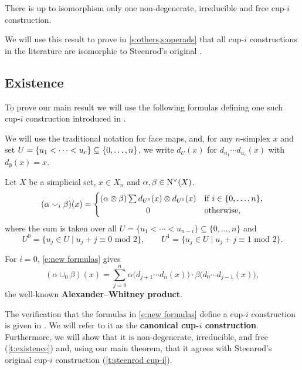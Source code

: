 \begin{theorem}\label{t:main}
	There is up to isomorphism only one non-degenerate, irreducible and free \mbox{cup-$i$} construction.
\end{theorem}

We will use this result to prove in \cref{s:others,s:operads} that all \mbox{cup-$i$} constructions in the literature are isomorphic to Steenrod's original \cite{steenrod1947products}.

\subsection{Existence}

To prove our main result we will use the following formulas defining one such \mbox{cup-$i$} construction introduced in \cite{medina2023fast_sq}.

\begin{notation*}
	We will use the traditional notation for face maps, and, for any $n$-simplex $x$ and set $U = \{u_1 < \dots < u_r\} \subseteq \set[big]{0,\dots,n}$, we write $d_U(x)$ for $d_{u_1}\! \dotsm d_{u_r}(x)$ with $d_{\emptyset}(x) = x$.
\end{notation*}

\begin{definition} \label{d:my cup-i}
	Let $X$ be a simplicial set, $x \in X_n$ and $\alpha, \beta \in \operatorname{N^{\vee}}(X)$.
	\begin{equation}\label{e:new formulas}
	(\alpha \cup_i \beta)(x) =
	\begin{cases}
	(\alpha \ot \beta) \sum d_{U^0}(x) \ot d_{U^1}(x) &
	\text{if } i \in \{0, \dots, n\}, \\
	\hfil 0 &
	\text{otherwise},
	\end{cases}
	\end{equation}
	where the sum is taken over all $U = \{u_1 < \cdots < u_{n-i}\} \subseteq \{0, \dots, n\}$ and
	\begin{equation*}
	U^0 = \{u_j \in U \mid u_j + j \equiv 0 \text{ mod } 2\}, \qquad
	U^1 = \{u_j \in U \mid u_j + j \equiv 1 \text{ mod } 2\}.
	\end{equation*}
\end{definition}

\begin{example}
	For $i = 0$, \cref{e:new formulas} gives
	\begin{equation*}
	(\alpha \cup_0 \beta)(x) =
	\sum_{j=0}^n \alpha \big(d_{j+1} \cdots d_{n}(x)\big) \cdot \beta \big(d_{0} \cdots d_{j-1}(x)\big),
	\end{equation*}
	the well-known \textbf{Alexander--Whitney product}.
\end{example}

The verification that the formulas in \cref{e:new formulas} define a \mbox{cup-$i$} construction is given in \cite{medina2023fast_sq}.
We will refer to it as the \textbf{canonical \mbox{cup-$i$} construction}.
Furthermore, we will show that it is non-degenerate, irreducible, and free (\cref{t:existence}) and, using our main theorem, that it agrees with Steenrod's original cup-$i$ construction (\cref{t:steenrod cup-i}).
